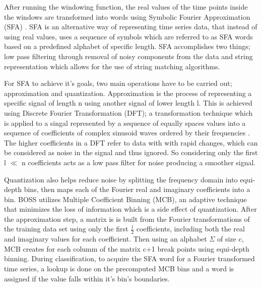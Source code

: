 After running the windowing function, the real values of the time points inside the windows are transformed into words using Symbolic Fourier Approximation (SFA) \cite{schafer2012sfa}.
SFA is an alternative way of representing time series data, that instead of using real values, uses a sequence of symbols which are referred to as SFA words based on a predefined alphabet of specific length.
SFA accomplishes two things; low pass filtering through removal of noisy components from the data and string representation which allows for the use of string matching algorithms.\newline

For SFA to achieve it's goals, two main operations have to be carried out; approximation and quantization.
Approximation is the process of representing a specific signal of length n using another signal of lower length l.
This is achieved using Discrete Fourier Transformation (DFT); a transformation technique which is applied to a singal represented by a sequence of equally spaces values
into a sequence of coefficients of complex sinusoid waves ordered by their frequencies \cite{liao2017separable}. The higher coefficients in a DFT refer to data with
with rapid changes, which can be considered as noise in the signal and thus ignored. So considering only the first l $\ll$ n coefficients acts as a low pass filter for noise
producing a smoother signal.

Quantization also helps reduce noise by splitting the frequency domain into equi-depth bins, then maps each of the Fourier real and imaginary coefficients into a bin.
BOSS utilizes Multiple Coefficient Binning (MCB), an adaptive technique that minimizes the loss of information which is a side effect of quantization.
After the approximation step, a matrix is is built from the Fourier transformations of the training data set using only the first $\frac{l}{2}$ coefficients,
including both the real and imaginary values for each coefficient. Then using an alphabet $\Sigma$ of size c, MCB creates for each columm of the matrix c+1 break points
using equi-depth binning. During classification, to acquire the SFA word for a Fourier transformed time series, a lookup is done on the precomputed MCB bins and
a word is assigned if the value falls within it's bin's boundaries.

